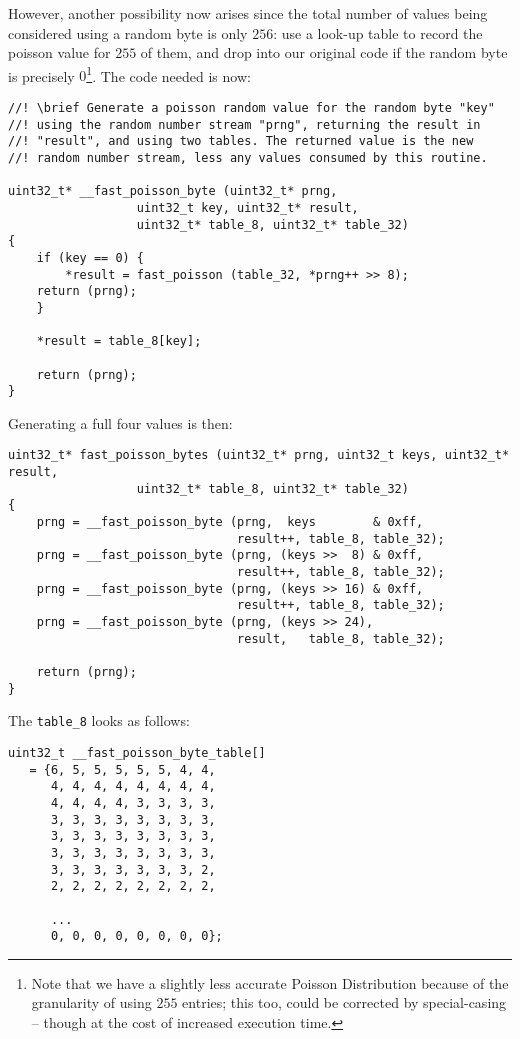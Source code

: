 However, another possibility now arises since the total number of
values being considered using a random byte is only $256$: use a look-up table to record
the poisson value for $255$ of them, and drop into our original code
if the random byte is precisely $0$\footnote{Note that we have a
  slightly less accurate Poisson Distribution because of the granularity
  of using  $255$ entries; this too, could be corrected by
  special-casing -- though at the cost of increased execution time.}.
The code needed is now:
\begin{verbatim}
//! \brief Generate a poisson random value for the random byte "key"
//! using the random number stream "prng", returning the result in
//! "result", and using two tables. The returned value is the new
//! random number stream, less any values consumed by this routine.

uint32_t* __fast_poisson_byte (uint32_t* prng,
			      uint32_t key, uint32_t* result,
			      uint32_t* table_8, uint32_t* table_32)
{
    if (key == 0) {
        *result = fast_poisson (table_32, *prng++ >> 8);
	return (prng);
    }

    *result = table_8[key];

    return (prng);
}
\end{verbatim}
Generating a full four values is then:
\begin{verbatim}
uint32_t* fast_poisson_bytes (uint32_t* prng, uint32_t keys, uint32_t* result,
			      uint32_t* table_8, uint32_t* table_32)
{
    prng = __fast_poisson_byte (prng,  keys        & 0xff,
                                result++, table_8, table_32);
    prng = __fast_poisson_byte (prng, (keys >>  8) & 0xff,
                                result++, table_8, table_32);
    prng = __fast_poisson_byte (prng, (keys >> 16) & 0xff,
                                result++, table_8, table_32);
    prng = __fast_poisson_byte (prng, (keys >> 24),
                                result,   table_8, table_32);

    return (prng);
}
\end{verbatim}
The {\tt table\_8} looks as follows:
\begin{verbatim}
uint32_t __fast_poisson_byte_table[]
   = {6, 5, 5, 5, 5, 5, 4, 4,
      4, 4, 4, 4, 4, 4, 4, 4,
      4, 4, 4, 4, 3, 3, 3, 3,
      3, 3, 3, 3, 3, 3, 3, 3,
      3, 3, 3, 3, 3, 3, 3, 3,
      3, 3, 3, 3, 3, 3, 3, 3,
      3, 3, 3, 3, 3, 3, 3, 2,
      2, 2, 2, 2, 2, 2, 2, 2,

      ...
      0, 0, 0, 0, 0, 0, 0, 0};
\end{verbatim}

